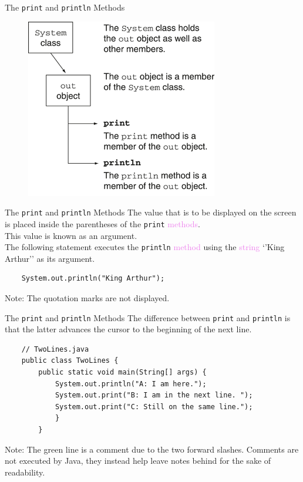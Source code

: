 \documentclass[11pt]{beamer}
\newcommand{\violet}[1]{\textcolor{violet}{#1}}
\begin{document}
\begin{frame}[fragile]{The \texttt{print} and \texttt{println} Methods}
    \noindent 
    \begin{figure}[H]
    \centering
    \includegraphics[scale=0.8]{Images/chapter02_section02_01.png}
    \end{figure}
\end{frame}

\begin{frame}[fragile]{The \texttt{print} and \texttt{println} Methods}
    The value that is to be displayed on the screen is placed inside the parentheses of the \texttt{print} \violet{methods}. \\ \vspace{1em}
    This value is known as an argument. \\ \vspace{1em}
    The following statement executes the \texttt{println} \violet{method} using the \violet{string} `'King Arthur'' as its argument. \\ \vspace{1em}
    \begin{lstlisting}
    System.out.println("King Arthur");
    \end{lstlisting}
    Note: The quotation marks are not displayed.
\end{frame}

\begin{frame}[fragile]{The \texttt{print} and \texttt{println} Methods}
    The difference between \texttt{print} and \texttt{println} is that the latter advances the cursor to the beginning of the next line.
    \begin{lstlisting}
    // TwoLines.java
    public class TwoLines {
        public static void main(String[] args) {
            System.out.println("A: I am here.");
            System.out.print("B: I am in the next line. ");
            System.out.print("C: Still on the same line.");
            }
        }
    \end{lstlisting}
    Note: The green line is a comment due to the two forward slashes. Comments are not executed by Java, they instead help leave notes behind for the sake of readability.
\end{frame}
\end{document}
